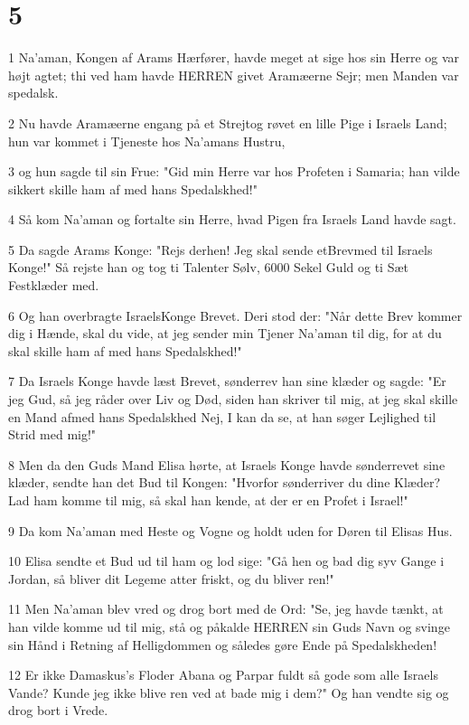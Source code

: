 \chapter{5}

\par 1 Na'aman, Kongen af Arams Hærfører, havde meget at sige hos sin Herre og var højt agtet; thi ved ham havde HERREN givet Aramæerne Sejr; men Manden var spedalsk.
\par 2 Nu havde Aramæerne engang på et Strejtog røvet en lille Pige i Israels Land; hun var kommet i Tjeneste hos Na'amans Hustru,
\par 3 og hun sagde til sin Frue: "Gid min Herre var hos Profeten i Samaria; han vilde sikkert skille ham af med hans Spedalskhed!"
\par 4 Så kom Na'aman og fortalte sin Herre, hvad Pigen fra Israels Land havde sagt.
\par 5 Da sagde Arams Konge: "Rejs derhen! Jeg skal sende etBrevmed til Israels Konge!" Så rejste han og tog ti Talenter Sølv, 6000 Sekel Guld og ti Sæt Festklæder med.
\par 6 Og han overbragte IsraelsKonge Brevet. Deri stod der: "Når dette Brev kommer dig i Hænde, skal du vide, at jeg sender min Tjener Na'aman til dig, for at du skal skille ham af med hans Spedalskhed!"
\par 7 Da Israels Konge havde læst Brevet, sønderrev han sine klæder og sagde: "Er jeg Gud, så jeg råder over Liv og Død, siden han skriver til mig, at jeg skal skille en Mand afmed hans Spedalskhed Nej, I kan da se, at han søger Lejlighed til Strid med mig!"
\par 8 Men da den Guds Mand Elisa hørte, at Israels Konge havde sønderrevet sine klæder, sendte han det Bud til Kongen: "Hvorfor sønderriver du dine Klæder? Lad ham komme til mig, så skal han kende, at der er en Profet i Israel!"
\par 9 Da kom Na'aman med Heste og Vogne og holdt uden for Døren til Elisas Hus.
\par 10 Elisa sendte et Bud ud til ham og lod sige: "Gå hen og bad dig syv Gange i Jordan, så bliver dit Legeme atter friskt, og du bliver ren!"
\par 11 Men Na'aman blev vred og drog bort med de Ord: "Se, jeg havde tænkt, at han vilde komme ud til mig, stå og påkalde HERREN sin Guds Navn og svinge sin Hånd i Retning af Helligdommen og således gøre Ende på Spedalskheden!
\par 12 Er ikke Damaskus's Floder Abana og Parpar fuldt så gode som alle Israels Vande? Kunde jeg ikke blive ren ved at bade mig i dem?" Og han vendte sig og drog bort i Vrede.
